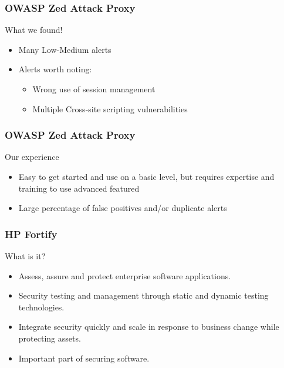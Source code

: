 \documentclass[12pt,norsk]{beamer}
\begin{document}
\begin{frame}
	\frametitle{OWASP Zed Attack Proxy}
	
	
	\begin{block}{What we found!}
		
		\begin{itemize}
			\item Many Low-Medium alerts
			\item Alerts worth noting:
			
			\begin{itemize}
				\item Wrong use of session management
				\item Multiple Cross-site scripting vulnerabilities			
			\end{itemize}
		
		\end{itemize}

	\end{block}
	
\end{frame}


\begin{frame}
	\frametitle{OWASP Zed Attack Proxy}
	
	\begin{block}{Our experience}
	
		\begin{itemize}
			\item Easy to get started and use on a basic level, but requires expertise and training to use advanced featured
			\item Large percentage of false positives and/or duplicate alerts
		\end{itemize}
	
	\end{block}
\end{frame}

\begin{frame}
	
	\frametitle{HP Fortify}
	
	\begin{block}{What is it?}
	
		\begin{itemize}
			\item Assess, assure and protect enterprise software applications.
			\item Security testing and management through static and dynamic testing technologies. 
			\item Integrate security quickly and scale in response to business change while protecting assets.
			\item Important part of securing software.
		 
		\end{itemize}				
	\end{block}
\end{frame}
\end{document}
